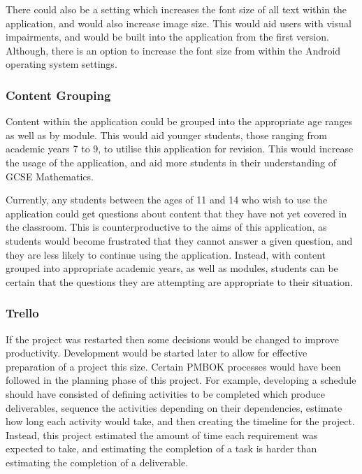 \documentclass{article}
\begin{document}
There could also be a setting which increases the font size of all text within the application, and would also increase image size. This would aid users with visual impairments, and would be built into the application from the first version. Although, there is an option to increase the font size from within the Android operating system settings. \par

\subsubsection{Content Grouping}

Content within the application could be grouped into the appropriate age ranges as well as by module. This would aid younger students, those ranging from academic years 7 to 9, to utilise this application for revision. This would increase the usage of the application, and aid more students in their understanding of GCSE Mathematics. \par

Currently, any students between the ages of 11 and 14 who wish to use the application could get questions about content that they have not yet covered in the classroom. This is counterproductive to the aims of this application, as students would become frustrated that they cannot answer a given question, and they are less likely to continue using the application. Instead, with content grouped into appropriate academic years, as well as modules, students can be certain that the questions they are attempting are appropriate to their situation. \par

\subsubsection{Trello}

If the project was restarted then some decisions would be changed to improve productivity. Development would be started later to allow for effective preparation of a project this size. Certain PMBOK processes would have been followed in the planning phase of this project. For example, developing a schedule should have consisted of defining activities to be completed which produce deliverables, sequence the activities depending on their dependencies, estimate how long each activity would take, and then creating the timeline for the project. Instead, this project estimated the amount of time each requirement was expected to take, and estimating the completion of a task is harder than estimating the completion of a deliverable. \par
\end{document}
